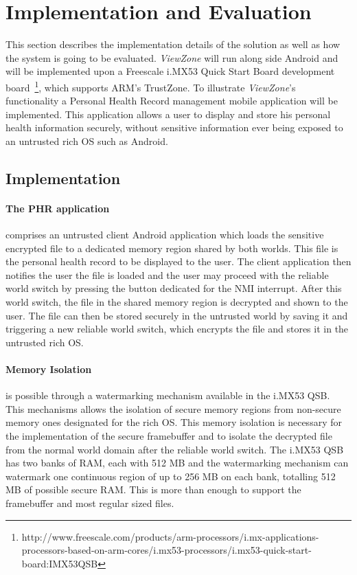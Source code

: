 
% 
% 
\section{Implementation and Evaluation}
\label{sec:evaluation}

This section describes the implementation details of the solution as well as how the system is going to be evaluated. \emph{ViewZone} will run along side Android and will be implemented upon a Freescale i.MX53 Quick Start Board development board~\footnote{http://www.freescale.com/products/arm-processors/i.mx-applications-processors-based-on-arm-cores/i.mx53-processors/i.mx53-quick-start-board:IMX53QSB}, which supports ARM's TrustZone. To illustrate \emph{ViewZone}'s functionality a Personal Health Record management mobile application will be implemented. This application allows a user to display and store his personal health information securely, without sensitive information ever being exposed to an untrusted rich OS such as Android.

\subsection{Implementation}

\paragraph{The \ac{PHR} application} comprises an untrusted client Android application which loads the sensitive encrypted file to a dedicated memory region shared by both worlds. This file is the personal health record to be displayed to the user. The client application then notifies the user the file is loaded and the user may proceed with the reliable world switch by pressing the button dedicated for the \ac{NMI} interrupt. After this world switch, the file in the shared memory region is decrypted and shown to the user. The file can then be stored securely in the untrusted world by saving it and triggering a new reliable world switch, which encrypts the file and stores it in the untrusted rich OS.

\paragraph{Memory Isolation} is possible through a watermarking mechanism available in the i.MX53 QSB. This mechanisms allows  the isolation of secure memory regions from non-secure memory ones designated for the rich OS. This memory isolation is necessary for the implementation of the secure framebuffer and to isolate the decrypted file from the normal world domain after the reliable world switch. The i.MX53 QSB has two banks of RAM, each with 512 MB and the watermarking mechanism can watermark one continuous region of up to 256 MB on each bank, totalling 512 MB of possible secure RAM. This is more than enough to support the framebuffer and most regular sized files.

